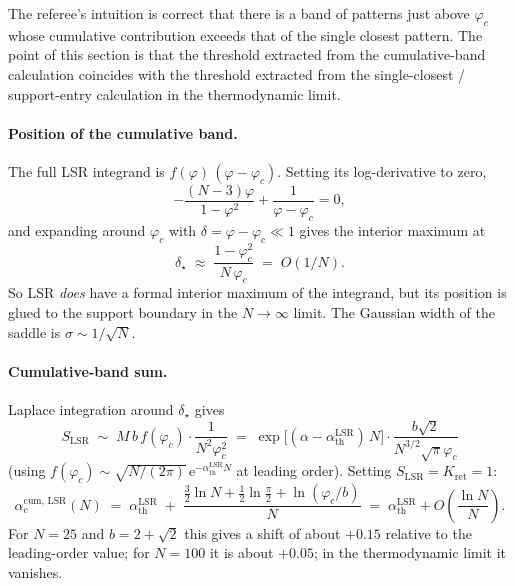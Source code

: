\documentclass[11pt]{article}
\newcommand{\athLSR}{\alpha_{\mathrm{th}}^{\mathrm{LSR}}}
\begin{document}
The referee's intuition is correct that there is a band of patterns just
above $\varphi_c$ whose cumulative contribution exceeds that of the single
closest pattern. The point of this section is that the threshold extracted
from the cumulative-band calculation coincides with the threshold extracted
from the single-closest / support-entry calculation in the thermodynamic
limit.

\paragraph{Position of the cumulative band.}
The full LSR integrand is $f(\varphi)\,(\varphi-\varphi_c)$. Setting its
log-derivative to zero,
\begin{equation}
-\frac{(N-3)\varphi}{1-\varphi^2} + \frac{1}{\varphi-\varphi_c} = 0,
\end{equation}
and expanding around $\varphi_c$ with $\delta = \varphi-\varphi_c \ll 1$
gives the interior maximum at
\begin{equation}
\delta_{\star} \;\approx\; \frac{1-\varphi_c^{2}}{N\,\varphi_c} \;=\; O(1/N).
\end{equation}
So LSR \emph{does} have a formal interior maximum of the integrand, but its
position is glued to the support boundary in the $N \to \infty$ limit. The
Gaussian width of the saddle is $\sigma \sim 1/\sqrt{N}$.

\paragraph{Cumulative-band sum.}
Laplace integration around $\delta_{\star}$ gives
\begin{equation}
S_{\mathrm{LSR}} \;\sim\; M \, b \, f(\varphi_c) \cdot \frac{1}{N^{2}\varphi_c^{2}}
\;=\; \exp\!\bigl[(\alpha - \athLSR)\,N\bigr] \cdot \frac{b\sqrt{2}}{N^{3/2}\sqrt{\pi}\varphi_c}
\end{equation}
(using $f(\varphi_c) \sim \sqrt{N/(2\pi)} \, \mathrm{e}^{-\athLSR N}$
at leading order). Setting $S_{\mathrm{LSR}} = K_{\mathrm{ret}} = 1$:
\begin{equation}
\alpha_c^{\mathrm{cum,\,LSR}}(N)
\;=\; \athLSR \;+\; \frac{\tfrac{3}{2}\ln N + \tfrac12 \ln \tfrac{\pi}{2} + \ln(\varphi_c/b)}{N}
\;=\; \athLSR + O\!\left(\frac{\ln N}{N}\right).
\label{eq:athLSR-cum}
\end{equation}
For $N = 25$ and $b = 2+\sqrt{2}$ this gives a shift of about $+0.15$
relative to the leading-order value; for $N = 100$ it is about $+0.05$; in
the thermodynamic limit it vanishes.
\end{document}

